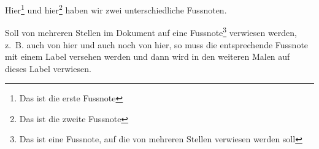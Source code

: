 
Hier\footnote{Das ist die erste Fussnote} und hier\footnote{Das ist die zweite Fussnote} haben wir zwei unterschiedliche Fussnoten.

\bigskip 
Soll von mehreren Stellen im Dokument auf eine Fussnote\footnote{Das ist eine Fussnote, auf die von mehreren Stellen verwiesen werden soll\label{ftn:multiUse}} verwiesen werden, z.~B. auch von hier und auch noch von hier, so muss die entsprechende Fussnote mit einem Label versehen werden und dann wird in den weiteren Malen auf dieses Label verwiesen.

\bigskip
\bigskip 
